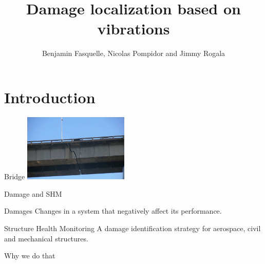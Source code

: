 \documentclass{beamer}
\title{Damage localization based on vibrations}
\author{Benjamin Fasquelle, Nicolas Pompidor and Jimmy Rogala}
\institute{École Normale Supérieure de Rennes, département Informatique et Télécommunications}
\begin{document}




  \begin{frame}
  \titlepage
  \end{frame}




\section{Introduction}

\begin{frame}{Bridge}
\includegraphics[width=5cm]{images/crack.jpg}
\end{frame}


\begin{frame}{Damage and SHM}
\begin{exampleblock}{Damages}
Changes in a system that negatively affect its performance.
\end{exampleblock}

\begin{exampleblock}{Structure Health Monitoring}
A damage identification strategy for aerospace, civil and mechanical structures.
\end{exampleblock}

\end{frame}


\begin{frame}{Why we do that}
\end{frame}
\end{document}
